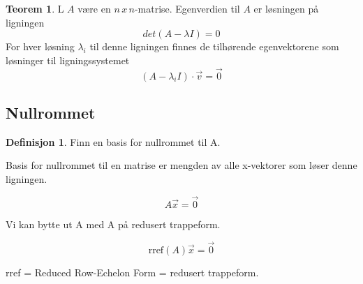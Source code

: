 \documentclass[11pt]{article}
\theoremstyle{definition}
\newtheorem{mindef}{Definisjon}[section]
\newenvironment{fmindef}
{\begin{mdframed}[style=minstil]\begin{mindef}}
		{\end{mindef}\end{mdframed}}
\theoremstyle{definition}
\theoremstyle{definition}
\theoremstyle{definition}
\newtheorem{teo}{Teorem}[section]
\newenvironment{fteo}
{\begin{mdframed}[style=minstil]\begin{teo}}
		{\end{teo}\end{mdframed}}
\theoremstyle{definition}
\theoremstyle{definition}
\begin{document}
		\begin{fteo}
			L \(A\) være en \(n\,x\,n \)-matrise. Egenverdien til \(A\) er løsningen på ligningen
			\[det(A-\lambda I)=0\]
			For hver løsning \(\lambda_{i}\) til denne ligningen finnes de tilhørende
			egenvektorene som løsninger til ligningssystemet
			\[(A-\lambda_iI)\cdot \vec{v}=\vec{0} \] 
		\end{fteo}
		
		
		\newpage
		
		\subsection{Nullrommet}
		
		\begin{fmindef}
		Finn en basis for nullrommet til A.
		
		 Basis for nullrommet til en matrise er mengden av alle x-vektorer som løser denne ligningen.
		
		\[A\vec{x}=\vec{0} \]
		
		Vi kan bytte ut A med A på redusert trappeform.
		
		\[\text{rref}(A)\vec{x}=\vec{0} \] 
		
		rref = Reduced Row-Echelon Form = redusert trappeform.
		\end{fmindef}
		
\end{document}
